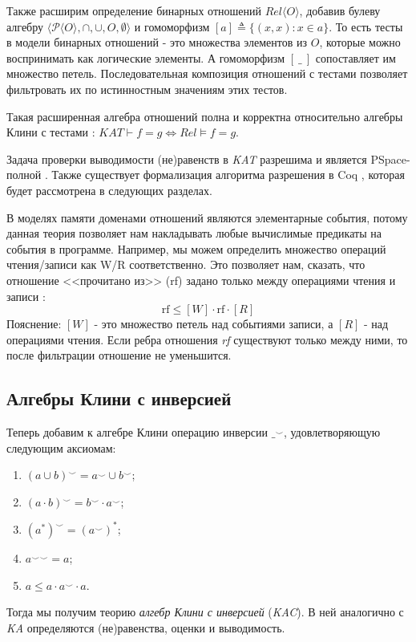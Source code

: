 \documentclass[times
              ,specification
              ,annotation
              ]{itmo-student-thesis}
\begin{document}
      Также расширим определение бинарных отношений $Rel \langle O \rangle $, добавив булеву алгебру $\langle
      \mathcal{P}\langle O \rangle, \cap, \cup, O, \emptyset \rangle$ и гомоморфизм $ [a] \triangleq \{(x, x): x \in a\} $.
      То есть тесты в модели бинарных отношений - это множества элементов из $O$, которые можно
      воспринимать как логические элементы. А гомоморфизм $[\:\_\:]$ сопоставляет им множество петель.
      Последовательная композиция отношений с тестами позволяет фильтровать их по истинностным значениям
      этих тестов.

      Такая расширенная алгебра отношений полна и корректна относительно алгебры Клини с тестами
      \cite{kat_completeness}: $\mathit{KAT} \vdash f = g \Leftrightarrow \mathit{Rel} \models f = g$.
      
      Задача проверки выводимости (не)равенств в \textit{KAT} разрешима и является PSpace-полной
      \cite{kat_complexity}. Также существует формализация алгоритма разрешения в Coq \cite{kat},
      которая будет рассмотрена в следующих разделах.

      В моделях памяти доменами отношений являются элементарные события, потому данная теория позволяет
      нам накладывать любые вычислимые предикаты на события в программе. Например, мы можем определить
      множество операций чтения/записи как W/R соответственно.
      Это позволяет нам, сказать, что отношение <<прочитано из>> (rf) задано только между
      операциями чтения и записи \cite{rc11}:
      $$ \text{rf} \leq [W] \cdot \text{rf} \cdot [R] $$
      Пояснение: $ [W] $ - это множество петель над событиями записи, а $[R]$ - над операциями чтения.
      Если ребра отношения \textit{rf} существуют только между ними, то после фильтрации отношение не
      уменьшится. 


    \subsection{Алгебры Клини с инверсией}
      Теперь добавим к алгебре Клини операцию инверсии $ \_^{\smile} $, удовлетворяющую следующим аксиомам:
      \begin{enumerate}
        \item $ (a \cup b)^{\smile} = a^{\smile} \cup b^{\smile} $;
        \item $ (a \cdot b)^{\smile} = b^{\smile} \cdot a^{\smile} $;
        \item $ (a^*)^{\smile} = (a^{\smile})^* $;
        \item $ {a^{\smile}}^{\smile} = a $;
        \item $ a \leq a \cdot a^{\smile} \cdot a $.
      \end{enumerate}
      Тогда мы получим теорию \textit{алгебр Клини с инверсией} (\textit{KAC}).
      В ней аналогично с \textit{KA} определяются (не)равенства, оценки и выводимость.
\end{document}
